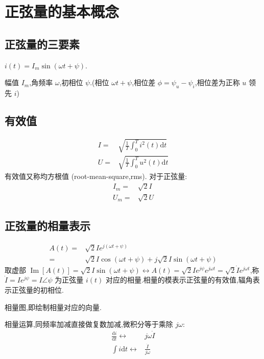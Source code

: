 
\usepackage{../../lectures_preamble}


    \section{正弦量的基本概念}
        \subsection{正弦量的三要素} $i(t)=I_m \sin(\omega t+\psi)$.
            
            幅值 $I_m$,角频率 $\omega$,初相位 $\psi$.(相位 $\omega t+\psi$,相位差 $\phi=\psi_{u}-\psi_{i}$,相位差为正称 $u$ 领先 $i$) 
        \subsection{有效值} 
            \begin{align}
                I=&\sqrt{\frac{1}{T}\int_{0}^{T}i^{2}(t)\mathrm{d}t}\\
                U=&\sqrt{\frac{1}{T}\int_{0}^{T}u^{2}(t)\mathrm{d}t}
            \end{align}
            有效值又称均方根值 (root-mean-square,rms). 对于正弦量: 
            \begin{align}
                I_m=&\sqrt{2}I\\
                U_m=&\sqrt{2}U
            \end{align}
        \subsection{正弦量的相量表示} 
        \begin{align}
            A(t)=&\sqrt{2}Ie^{j(\omega t+\psi)}\nonumber\\
            =&\sqrt{2}I\cos{(\omega t+\psi)}+j\sqrt{2}I\sin{(\omega t+\psi)}
        \end{align}
        取虚部 $\operatorname{Im}[A(t)]=\sqrt{2}I\sin{(\omega t+\psi)}\leftrightarrow A(t)=\sqrt{2}Ie^{j\psi}e^{j\omega t}=\sqrt{2}\dot{I}e^{j\omega t}$,称 $\dot{I}=Ie^{j\psi}=I\angle \psi$ 为正弦量 $i(t)$ 对应的相量.相量的模表示正弦量的有效值,辐角表示正弦量的初相位.

        相量图,即绘制相量对应的向量.

        相量运算,同频率加减直接做复数加减,微积分等于乘除 $j\omega$:
        \begin{align}
            \frac{\mathrm{d}i}{\mathrm{d}t}\leftrightarrow&j\omega\dot{I}\\\int i\mathrm{d}t\leftrightarrow&\frac{\dot{I}}{j\omega}
        \end{align}

